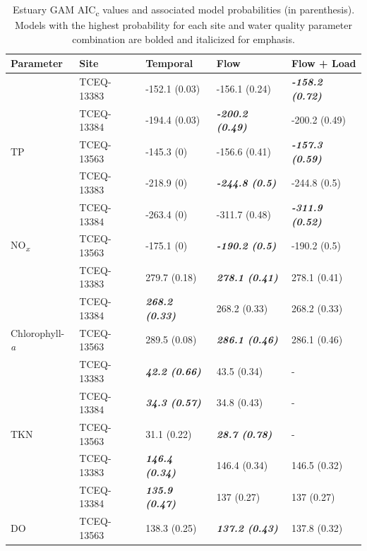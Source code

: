 \documentclass[water,article,submit,oneauthor]{Definitions/mdpi}
\begin{document}
\begin{table}[H]

\caption{\label{tab:tab4}Estuary GAM AIC\textsubscript{c} values and associated model probabilities (in parenthesis). Models with the highest probability for each site and water quality parameter combination are bolded and italicized for emphasis.}
\centering
\begin{tabular}[t]{ll>{}l>{}l>{}l}
\toprule
Parameter & Site & Temporal & Flow & Flow + Load\\
\midrule
 & TCEQ-13383 & -152.1 (0.03) & -156.1 (0.24) & \em{\textbf{-158.2 (0.72)}}\\

 & TCEQ-13384 & -194.4 (0.03) & \em{\textbf{-200.2 (0.49)}} & -200.2 (0.49)\\

\multirow{-3}{*}{\raggedright\arraybackslash TP} & TCEQ-13563 & -145.3 (0) & -156.6 (0.41) & \em{\textbf{-157.3 (0.59)}}\\
\cmidrule{1-5}
 & TCEQ-13383 & -218.9 (0) & \em{\textbf{-244.8 (0.5)}} & -244.8 (0.5)\\

 & TCEQ-13384 & -263.4 (0) & -311.7 (0.48) & \em{\textbf{-311.9 (0.52)}}\\

\multirow{-3}{*}{\raggedright\arraybackslash NO\textsubscript{\emph{x}}} & TCEQ-13563 & -175.1 (0) & \em{\textbf{-190.2 (0.5)}} & -190.2 (0.5)\\
\cmidrule{1-5}
 & TCEQ-13383 & 279.7 (0.18) & \em{\textbf{278.1 (0.41)}} & 278.1 (0.41)\\

 & TCEQ-13384 & \em{\textbf{268.2 (0.33)}} & 268.2 (0.33) & 268.2 (0.33)\\

\multirow{-3}{*}{\raggedright\arraybackslash Chlorophyll-\emph{a}} & TCEQ-13563 & 289.5 (0.08) & \em{\textbf{286.1 (0.46)}} & 286.1 (0.46)\\
\cmidrule{1-5}
 & TCEQ-13383 & \em{\textbf{42.2 (0.66)}} & 43.5 (0.34) & -\\

 & TCEQ-13384 & \em{\textbf{34.3 (0.57)}} & 34.8 (0.43) & -\\

\multirow{-3}{*}{\raggedright\arraybackslash TKN} & TCEQ-13563 & 31.1 (0.22) & \em{\textbf{28.7 (0.78)}} & -\\
\cmidrule{1-5}
 & TCEQ-13383 & \em{\textbf{146.4 (0.34)}} & 146.4 (0.34) & 146.5 (0.32)\\

 & TCEQ-13384 & \em{\textbf{135.9 (0.47)}} & 137 (0.27) & 137 (0.27)\\

\multirow{-3}{*}{\raggedright\arraybackslash DO} & TCEQ-13563 & 138.3 (0.25) & \em{\textbf{137.2 (0.43)}} & 137.8 (0.32)\\
\bottomrule
\end{tabular}
\end{table}
\end{document}
